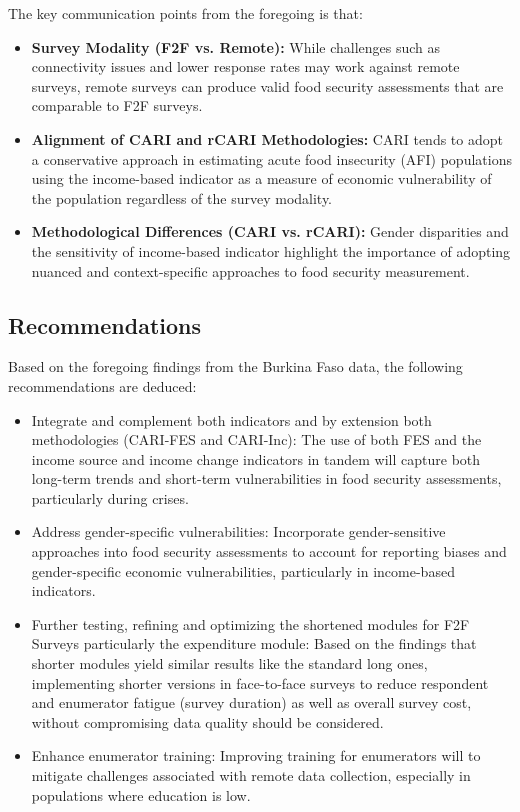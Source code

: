 \documentclass[11pt,harvard]{article}
\begin{document}
	The key communication points from the foregoing is that:
	\begin{itemize}[left=2.5em]
		\item \textbf{Survey Modality (F2F vs. Remote):} While challenges such as connectivity issues and lower response rates may work against remote surveys, remote surveys can produce valid food security assessments that are comparable to F2F surveys.
		\item \textbf{Alignment of CARI and rCARI Methodologies:} CARI tends to adopt a conservative approach in estimating acute food insecurity (AFI) populations using the income-based indicator as a measure of economic vulnerability of the population regardless of the survey modality.
		\item \textbf{Methodological Differences (CARI vs. rCARI):} Gender disparities and the sensitivity of income-based indicator highlight the importance of adopting nuanced and context-specific approaches to food security measurement.
	\end{itemize}
	
	
	\subsection{Recommendations}
	Based on the foregoing findings from the Burkina Faso data, the following recommendations are deduced:
	\begin{itemize}
		\item Integrate and complement both indicators and by extension both methodologies (CARI-FES and CARI-Inc): The use of both FES and the income source and income change indicators in tandem will capture both long-term trends and short-term vulnerabilities in food security assessments, particularly during crises.
		\item Address gender-specific vulnerabilities: Incorporate gender-sensitive approaches into food security assessments to account for reporting biases and gender-specific economic vulnerabilities, particularly in income-based indicators.
		\item Further testing, refining and optimizing the shortened modules for F2F Surveys particularly the expenditure module: Based on the findings that shorter modules yield similar results like the standard long ones, implementing shorter versions in face-to-face surveys to reduce respondent and enumerator fatigue (survey duration) as well as overall survey cost, without compromising data quality should be considered.
		\item Enhance enumerator training: Improving training for enumerators will to mitigate challenges associated with remote data collection, especially in populations where education is low.
		
	\end{itemize}	
\end{document}
